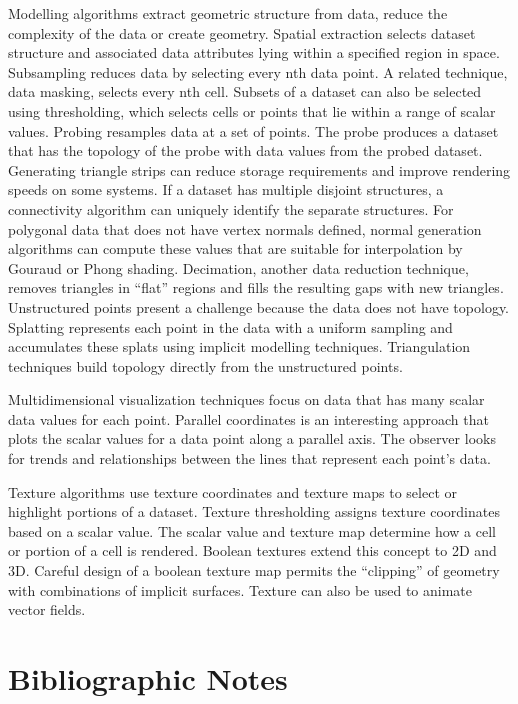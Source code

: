 Modelling algorithms extract geometric structure from data, reduce the complexity of the data or create geometry. Spatial extraction selects dataset structure and associated data attributes lying within a specified region in space. Subsampling reduces data by selecting every nth data point. A related technique, data masking, selects every nth cell. Subsets of a dataset can also be selected using thresholding, which selects cells or points that lie within a range of scalar values. Probing resamples data at a set of points. The probe produces a dataset that has the topology of the probe with data values from the probed dataset. Generating triangle strips can reduce storage requirements and improve rendering speeds on some systems. If a dataset has multiple disjoint structures, a connectivity algorithm can uniquely identify the separate structures. For polygonal data that does not have vertex normals defined, normal generation algorithms can compute these values that are suitable for interpolation by Gouraud or Phong shading. Decimation, another data reduction technique, removes triangles in ``flat'' regions and fills the resulting gaps with new triangles. Unstructured points present a challenge because the data does not have topology. Splatting represents each point in the data with a uniform sampling and accumulates these splats using implicit modelling techniques. Triangulation techniques build topology directly from the unstructured points.

Multidimensional visualization techniques focus on data that has many scalar data values for each point. Parallel coordinates is an interesting approach that plots the scalar values for a data point along a parallel axis. The observer looks for trends and relationships between the lines that represent each point's data.

Texture algorithms use texture coordinates and texture maps to select or highlight portions of a dataset. Texture thresholding assigns texture coordinates based on a scalar value. The scalar value and texture map determine how a cell or portion of a cell is rendered. Boolean textures extend this concept to 2D and 3D. Careful design of a boolean texture map permits the ``clipping'' of geometry with combinations of implicit surfaces. Texture can also be used to animate vector fields.

\section{ Bibliographic Notes}

